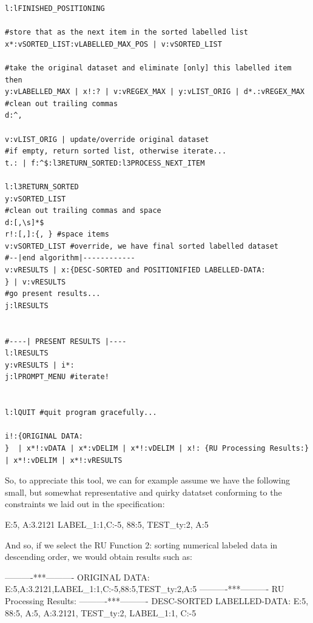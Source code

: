 \documentclass[a4paper, 18pt]{book} %
\begin{document}
{{\begin{tcolorbox}[teaterminalstyle, title=TEA Program: Ranking Utility v.3, breakable]
\begin{lstlisting}[language=TEA,breaklines=true,]
l:lFINISHED_POSITIONING

#store that as the next item in the sorted labelled list
x*:vSORTED_LIST:vLABELLED_MAX_POS | v:vSORTED_LIST

#take the original dataset and eliminate [only] this labelled item then
y:vLABELLED_MAX | x!:? | v:vREGEX_MAX | y:vLIST_ORIG | d*.:vREGEX_MAX
#clean out trailing commas
d:^,

v:vLIST_ORIG | update/override original dataset 
#if empty, return sorted list, otherwise iterate...
t.: | f:^$:l3RETURN_SORTED:l3PROCESS_NEXT_ITEM

l:l3RETURN_SORTED
y:vSORTED_LIST 
#clean out trailing commas and space
d:[,\s]*$
r!:[,]:{, } #space items
v:vSORTED_LIST #override, we have final sorted labelled dataset
#--|end algorithm|------------
v:vRESULTS | x:{DESC-SORTED and POSITIONIFIED LABELLED-DATA: 
} | v:vRESULTS
#go present results...
j:lRESULTS


#----| PRESENT RESULTS |----
l:lRESULTS
y:vRESULTS | i*:
j:lPROMPT_MENU #iterate!


l:lQUIT #quit program gracefully...

i!:{ORIGINAL DATA:
}  | x*!:vDATA | x*:vDELIM | x*!:vDELIM | x!: {RU Processing Results:} | x*!:vDELIM | x*!:vRESULTS
   \end{lstlisting}
  \end{tcolorbox}
  \label{FIGOEX2}
  \vspace{1cm}
  

\vspace{2em}

So, to appreciate this tool, we can for example assume we have the following small, but somewhat representative and quirky datatset conforming to the constraints we laid out in the specification:

  \vspace{2em}
  
       \begin{tcbverbatim}[title=Sample Well-formatted INPUT Dataset of 7 Labeled Numerical Expressions]
E:5, A:3.2121 LABEL_1:1,C:-5, 88:5,  TEST_ty:2, A:5
  \end{tcbverbatim}
 

\vspace{2em}

And so, if we select the RU Function 2: sorting numerical labeled data in descending order, we would obtain results such as:

    
     \begin{tcbverbatim}[title=Sample Well-formatted OUTPUT from Task 2 of RU]
----------***----------
ORIGINAL DATA:
E:5,A:3.2121,LABEL_1:1,C:-5,88:5,TEST_ty:2,A:5
----------***----------
RU Processing Results:
----------***----------
DESC-SORTED LABELLED-DATA: 
E:5, 88:5, A:5, A:3.2121, TEST_ty:2, LABEL_1:1, C:-5
  \end{tcbverbatim}
 
}}
\end{document}

